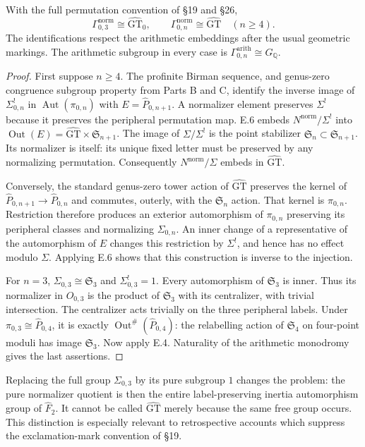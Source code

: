 With the full permutation convention of \S19 and \S26,
\[
 \Gamma^{\mathrm{norm}}_{0,3}\cong\widehat{\mathrm{GT}}_0,
 \qquad
 \Gamma^{\mathrm{norm}}_{0,n}\cong\widehat{\mathrm{GT}}
       \quad(n\geq4).
\]
The identifications respect the arithmetic embeddings after the usual
geometric markings.  The arithmetic subgroup in every case is
$\Gamma^{\mathrm{arith}}_{0,n}\cong G_{\mathbb Q}$.
\begin{proof}
First suppose $n\geq4$.  The profinite Birman sequence, and genus-zero
congruence subgroup property from Parts B and C, identify the inverse
image of $\Sigma^!_{0,n}$ in $\operatorname{Aut}(\pi_{0,n})$ with
$E=\widehat P_{0,n+1}$.  A normalizer element preserves $\Sigma^!$ because
it preserves the peripheral permutation map.  E.6 embeds
$N^{\mathrm{norm}}/\Sigma^!$ into
$\operatorname{Out}(E)=\widehat{\mathrm{GT}}\times\mathfrak S_{n+1}$.
The image of $\Sigma/\Sigma^!$ is the point stabilizer
$\mathfrak S_n\subset\mathfrak S_{n+1}$.  Its normalizer is itself:
its unique fixed letter must be preserved by any normalizing permutation.
Consequently $N^{\mathrm{norm}}/\Sigma$ embeds in
$\widehat{\mathrm{GT}}$.

Conversely, the standard genus-zero tower action of
$\widehat{\mathrm{GT}}$ preserves the kernel of
$\widehat P_{0,n+1}\to\widehat P_{0,n}$ and commutes, outerly, with
the $\mathfrak S_n$ action.  That kernel is $\pi_{0,n}$.  Restriction
therefore produces an exterior automorphism of $\pi_{0,n}$ preserving
its peripheral classes and normalizing $\Sigma_{0,n}$.  An inner change
of a representative of the automorphism of $E$ changes this restriction
by $\Sigma^!$, and hence has no effect modulo $\Sigma$.
Applying E.6 shows that this construction is inverse to the injection.

For $n=3$, $\Sigma_{0,3}\cong\mathfrak S_3$ and
$\Sigma^!_{0,3}=1$.  Every automorphism of $\mathfrak S_3$ is inner.
Thus its normalizer in $O_{0,3}$ is the product of $\mathfrak S_3$ with
its centralizer, with trivial intersection.  The centralizer acts
trivially on the three peripheral labels.  Under
$\pi_{0,3}\cong\widehat P_{0,4}$, it is exactly
$\operatorname{Out}^{\#}(\widehat P_{0,4})$: the relabelling action of
$\mathfrak S_4$ on four-point moduli has image $\mathfrak S_3$.
Now apply E.4.  Naturality of the arithmetic monodromy gives the last
assertions.
\end{proof}

Replacing the full group $\Sigma_{0,3}$ by its pure subgroup $1$ changes
the problem: the pure normalizer quotient is then the entire
label-preserving inertia automorphism group of $\widehat F_2$.
It cannot be called $\widehat{\mathrm{GT}}$ merely because the same free
group occurs.  This distinction is especially relevant to retrospective
accounts which suppress the exclamation-mark convention of \S19.

